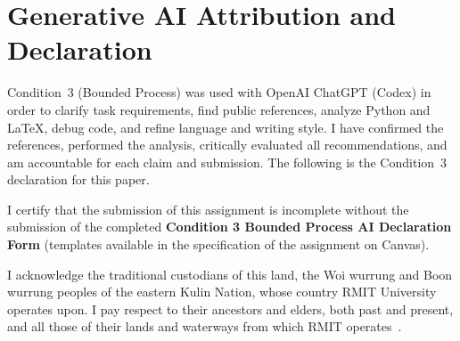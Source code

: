 \documentclass[manuscript,screen,review,nonacm]{acmart}
\begin{document}
\section*{Generative AI Attribution and Declaration}
Condition~3 (Bounded Process) was used with OpenAI ChatGPT (Codex) in order to clarify task requirements, find public references, analyze Python and \LaTeX, debug code, and refine language and writing style. I have confirmed the references, performed the analysis, critically evaluated all recommendations, and am accountable for each claim and submission. The following is the Condition~3 declaration for this paper.

I certify that the submission of this assignment is incomplete without the submission of the completed \textbf{Condition 3 Bounded Process AI Declaration Form} (templates available in the specification of the assignment on Canvas).

\begin{acks}
I acknowledge the traditional custodians of this land, the Woi wurrung and Boon wurrung peoples of the eastern Kulin Nation, whose country RMIT University operates upon. I pay respect to their ancestors and elders, both past and present, and all those of their lands and waterways from which RMIT operates~\cite{rmit2026country}.
\end{acks}





\appendix

\end{document}
